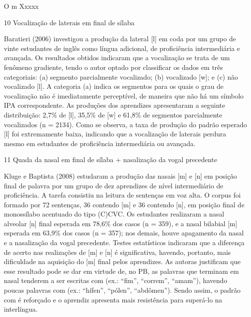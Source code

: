 O m Xxxxx

10 Vocaliza\c{c}\~ao de laterais em final de s\'ilaba

Baratieri (2006) investigou a produ\c{c}\~ao da lateral {[}l{]} em coda por um
grupo de vinte estudantes de ingl\^es como l\'ingua adicional, de
profici\^encia intermedi\'aria e avan\c{c}ada. Os resultados obtidos indicaram
que a vocaliza\c{c}\~ao se trata de um fen\^omeno gradiente, tendo o autor
optado por classificar os dados em tr\^es categoriais: (a) segmento
parcialmente vocalizado; (b) vocalizado {[}w{]}; e (c) n\~ao vocalizado
{[}l{]}. A categoria (a) indica os segmentos para os quais o grau de
vocaliza\c{c}\~ao n\~ao \'e imediatamente percept\'ivel, de maneira que n\~ao h\'a um
s\'imbolo IPA correspondente. As produ\c{c}\~oes dos aprendizes apresentaram a
seguinte distribui\c{c}\~ao: 2,7\% de {[}l{]}, 35,5\% de {[}w{]} e 61,8\% de
segmentos parcialmente vocalizados (n = 2134). Como se observa, a taxa
de produ\c{c}\~ao do padr\~ao esperado {[}l{]} foi extremamente baixa, indicando
que a vocaliza\c{c}\~ao de laterais perdura mesmo em estudantes de
profici\^encia intermedi\'aria ou avan\c{c}ada.

11 Quada da nasal em final de s\'ilaba + nasaliza\c{c}\~ao da vogal precedente

Kluge e Baptista (2008) estudaram a produ\c{c}\~ao das nasais {[}m{]} e
{[}n{]} em posi\c{c}\~ao final de palavra por um grupo de dez aprendizes de
n\'ivel intermedi\'ario de profici\^encia. A tarefa consistiu na leitura de
senten\c{c}as em voz alta. O corpus foi formado por 72 senten\c{c}as, 36
contendo {[}m{]} e 36 contendo {[}n{]}, em posi\c{c}\~ao final de monoss\'ilabo
acentuado do tipo (C)CVC. Os estudantes realizaram a nasal alveolar
{[}n{]} final esperada em 78,6\% dos casos (n = 359), e a nasal bilabial
{[}m{]} esperada em 63,9\% dos casos (n = 357); nos demais, houve
apagamento da nasal e a nasaliza\c{c}\~ao da vogal precedente. Testes
estat\'isticos indicaram que a diferen\c{c}a de acerto nas realiza\c{c}\~oes de
{[}m{]} e {[}n{]} \'e significativa, havendo, portanto, mais dificuldade
na aquisi\c{c}\~ao do {[}m{]} final pelos aprendizes. As autoras justificam
que esse resultado pode se dar em virtude de, no PB, as palavras que
terminam em nasal tenderem a ser escritas com (ex.: ``fim'', ``correm'',
``amam''), havendo poucas palavras com (ex.: ``h\'ifen'', ``p\'olen'',
``abd\^omen''). Sendo assim, o padr\~ao com \'e refor\c{c}ado e o aprendiz
apresenta mais resist\^encia para super\'a-lo na interl\'ingua.

